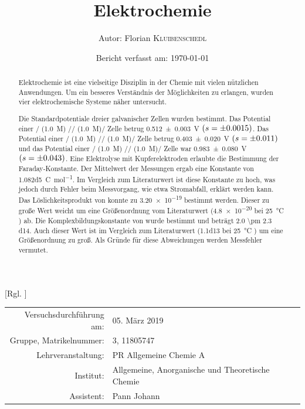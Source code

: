 \documentclass{article}
\title{Elektrochemie \cite{Versuchsvorschrift}} %
\author{Autor: Florian \textsc{Kluibenschedl}} %
\date{Bericht verfasst am: \today} %
\begin{document}
  [Rgl. ]{}{}
  
  \maketitle %
  
  \begin{center}
    \begin{tabular}{r p{4cm}}
      Versuchsdurchführung am: & 05. März 2019\\ %
      Gruppe, Matrikelnummer: & 3, 11805747 \\
      Lehrveranstaltung: & PR Allgemeine Chemie A \\
      Institut: & Allgemeine, Anorganische und Theoretische Chemie \\
      Assistent: & Pann Johann %
    \end{tabular}
  \end{center}


  \begin{abstract}
    Elektrochemie ist eine vielseitige Disziplin in der Chemie mit vielen nützlichen Anwendungen. Um ein besseres Verständnis der Möglichkeiten zu erlangen, wurden vier elektrochemische Systeme näher untersucht.
    
    Die Standardpotentiale dreier galvanischer Zellen wurden bestimmt. Das Potential einer / (\SI[mode=text]{1.0}{M}) //  (\SI[mode=text]{1.0}{M})/ Zelle betrug \SI[separate-uncertainty]{0.512 \pm 0.003}{V} $(s=\num{\pm 0.0015})$. Das Potential einer / (\SI[mode=text]{1.0}{M}) //  (\SI[mode=text]{1.0}{M})/ Zelle betrug \SI[separate-uncertainty]{0.403 \pm 0.020}{V} $(s=\num{\pm 0.011})$ und das Potential einer / (\SI[mode=text]{1.0}{M}) //  (\SI[mode=text]{1.0}{M})/ Zelle war \SI[separate-uncertainty]{0.983 \pm 0.080}{V} $(s=\num{\pm 0.043})$. Eine Elektrolyse mit Kupferelektroden erlaubte die Bestimmung der Faraday-Konstante. Der Mittelwert der Messungen ergab eine Konstante von \SI[mode=text]{1.082d5}{\coulomb\per\mole}. Im Vergleich zum Literaturwert ist diese Konstante zu hoch, was jedoch durch Fehler beim Messvorgang, wie etwa Stromabfall, erklärt werden kann. Das Löslichkeitsprodukt von  konnte zu \num{3.20e-19} bestimmt werden. Dieser zu große Wert weicht um eine Größenordnung vom Literaturwert (\num{4.8e-20} bei \SI[mode=text]{25}{\degreeCelsius} \cite{LoslichkeitWerteCUOH}) ab. Die Komplexbildungskonstante von \ch{[Cu(NH3)4]\pch[2]\aq} wurde bestimmt und beträgt \SI[mode=text, separate-uncertainty]{2.0 \pm 2.3 d14}{}. Auch dieser Wert ist im Vergleich zum Literaturwert (\num{1.1d13} bei \SI[mode=text]{25}{\degreeCelsius} \cite{KomplexFormation}) um eine Größenordnung zu groß. Als Gründe für diese Abweichungen werden Messfehler vermutet.
  \end{abstract}
  
\end{document}
